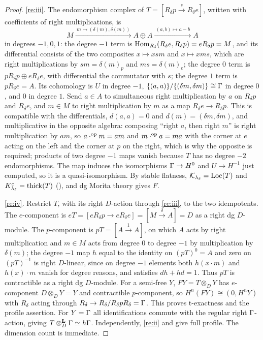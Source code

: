 \begin{proof}
\ref{re:iii}.  The endomorphism complex of \(T=[R_\delta p\xrightarrow{s}R_\delta e]\), written with coefficients of right multiplications, is
\[
 M\xrightarrow{\ m\mapsto(\delta(m),\delta(m))\ }A\oplus A\xrightarrow{\ (a,b)\mapsto a-b\ }A
\]
in degrees \(-1,0,1\): the degree \(-1\) term is \(\operatorname{Hom}_{R_\delta}(R_\delta e,R_\delta p)=eR_\delta p=M\), and its differential consists of the two composites \(x\mapsto xsm\) and \(x\mapsto xms\), which are right multiplications by \(sm=\delta(m)_p\) and \(ms=\delta(m)_e\); the degree \(0\) term is \(pR_\delta p\oplus eR_\delta e\), with differential the commutator with \(s\); the degree \(1\) term is \(pR_\delta e=A\).  Its cohomology is \(U\) in degree \(-1\), \(\{(a,a)\}/\{(\delta m,\delta m)\}\cong\Gamma\) in degree \(0\), and \(0\) in degree \(1\).  Send \(a\in A\) to simultaneous right multiplication by \(a\) on \(R_\delta p\) and \(R_\delta e\), and \(m\in M\) to right multiplication by \(m\) as a map \(R_\delta e\to R_\delta p\).  This is compatible with the differentials, \(d(a,a)=0\) and \(d(m)=(\delta m,\delta m)\), and multiplicative in the opposite algebra: composing ``right \(a\), then right \(m\)'' is right multiplication by \(am\), so \(a\cdot^{\mathrm{op}}m=am\) and \(m\cdot^{\mathrm{op}}a=ma\) with the corner at \(e\) acting on the left and the corner at \(p\) on the right, which is why the opposite is required; products of two degree \(-1\) maps vanish because \(T\) has no degree \(-2\) endomorphisms.  The map induces the isomorphisms \(\Gamma\to H^0\) and \(U\to H^{-1}\) just computed, so it is a quasi-isomorphism.  By stable flatness, \(\mathcal K_{\lambda_\delta}=\operatorname{Loc}(T)\) and \(K^c_{\lambda_\delta}=\operatorname{thick}(T)\) (), and dg Morita theory gives \(F\).

\ref{re:iv}.  Restrict \(T\), with its right \(D\)-action through \ref{re:iii}, to the two idempotents.  The \(e\)-component is \(eT=[eR_\delta p\to eR_\delta e]=[M\xrightarrow{\delta}A]=D\) as a right dg \(D\)-module.  The \(p\)-component is \(pT=[A\xrightarrow{1}A]\), on which \(A\) acts by right multiplication and \(m\in M\) acts from degree \(0\) to degree \(-1\) by multiplication by \(\delta(m)\); the degree \(-1\) map \(h\) equal to the identity on \((pT)^0=A\) and zero on \((pT)^{-1}\) is right \(D\)-linear, since on degree \(-1\) elements both \(h(x\cdot m)\) and \(h(x)\cdot m\) vanish for degree reasons, and satisfies \(dh+hd=1\).  Thus \(pT\) is contractible as a right dg \(D\)-module.  For a semi-free \(Y\), \(FY=T\otimes_DY\) has \(e\)-component \(D\otimes_DY=Y\) and contractible \(p\)-component, so \(H^n(FY)\cong(0,H^nY)\) with \(R_\delta\) acting through \(R_\delta\to R_\delta/R_\delta pR_\delta=\Gamma\).  This proves t-exactness and the profile assertion.  For \(Y=\Gamma\) all identifications commute with the regular right \(\Gamma\)-action, giving \(T\otimes^{\mathbf L}_D\Gamma\simeq h\Gamma\).  Independently, \ref{re:ii} and  give full profile.  The dimension count is immediate.
\end{proof}

